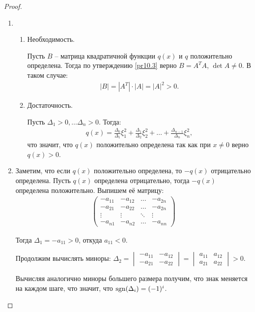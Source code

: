 \begin{proof}~
    \begin{enumerate}
        \item \begin{enumerate}
            \item Необходимость.
            
            Пусть $B$ -- матрица квадратичной функции $q(x)$ и $q$ положительно определена.
            Тогда по утверждению \ref{pr10.3} верно $B = A^T A$, $\det A \neq 0$. В таком случае: 
            \begin{gather*}
                |B| = |A^T| \cdot |A| = |A|^2 > 0.
            \end{gather*}
            \item Достаточность.
            
            Пусть $\Delta_1 > 0, \dots \Delta_n > 0$. Тогда: 
            \begin{gather*}
                q(x) = \frac{\Delta_0}{\Delta_1} \xi_1^2 + \frac{\Delta_1}{\Delta_2} \xi_2^2 + \dots + 
                \frac{\Delta_{n-1}}{\Delta_n} \xi_n^2,
            \end{gather*}
            что значит, что $q(x)$ положительно определена так как при $x \neq 0$ верно $q(x) > 0$.
        \end{enumerate}
        \item Заметим, что если $q(x)$ положительно определена, то $-q(x)$ отрицательно определена. Пусть 
        $q(x)$ определена отрицательно, тогда $-q(x)$ определена положительно. Выпишем её матрицу:
        \begin{gather*}
            \begin{pmatrix}
                -a_{11} & -a_{12} & \dots  & -a_{2n} \\
                -a_{21} & -a_{22} & \dots  & -a_{2n} \\
                \vdots  & \vdots  & \ddots & \vdots  \\
                -a_{n1} & -a_{n2} & \dots  & -a_{nn}
            \end{pmatrix}
        \end{gather*}

        Тогда $\Delta_1 = -a_{11} > 0$, откуда $a_{11} < 0$. 
        
        Продолжим вычислять миноры:
        $\Delta_2 = \begin{vmatrix}
        -a_{11} & -a_{12}  \\
        -a_{21} & -a_{22}  
        \end{vmatrix} = \begin{vmatrix}
            a_{11} & a_{12}  \\
            a_{21} & a_{22}  
        \end{vmatrix} > 0$. 
        
        Вычисляя аналогично миноры большего размера получим, 
        что знак меняется на каждом шаге, что значит, что $\operatorname{sgn}(\Delta_i) = (-1)^i$.
    \end{enumerate}
\end{proof}

